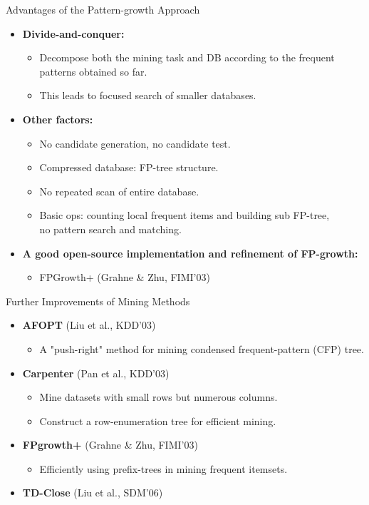 \begin{frame}{Advantages of the Pattern-growth Approach}
	\begin{itemize}
		\item \textbf{Divide-and-conquer:}
		      \begin{itemize}
			      \item Decompose both the mining task and DB according
			            to the frequent patterns obtained so far.
			      \item This leads to focused search of smaller databases.
		      \end{itemize}
		\item \textbf{Other factors:}
		      \begin{itemize}
			      \item No candidate generation, no candidate test.
			      \item Compressed database: FP-tree structure.
			      \item No repeated scan of entire database.
			      \item Basic ops: counting local frequent items and building sub
			            FP-tree,\\
			            no pattern search and matching.
		      \end{itemize}
		\item \textbf{A good open-source implementation and refinement of
			      FP-growth:}
		      \begin{itemize}
			      \item FPGrowth+ (Grahne \& Zhu, FIMI'03)
		      \end{itemize}
	\end{itemize}
\end{frame}

\begin{frame}{Further Improvements of Mining Methods}
	\begin{itemize}
		\item \textbf{AFOPT} (Liu et al., KDD'03)
		      \begin{itemize}
			      \item A "push-right" method for mining condensed frequent-pattern
			            (CFP) tree.
		      \end{itemize}
		\item \textbf{Carpenter} (Pan et al., KDD'03)
		      \begin{itemize}
			      \item Mine datasets with small rows but numerous columns.
			      \item Construct a row-enumeration tree for efficient mining.
		      \end{itemize}
		\item \textbf{FPgrowth+} (Grahne \& Zhu, FIMI'03)
		      \begin{itemize}
			      \item Efficiently using prefix-trees in mining frequent itemsets.
		      \end{itemize}
		\item \textbf{TD-Close} (Liu et al., SDM'06)
	\end{itemize}
\end{frame}

